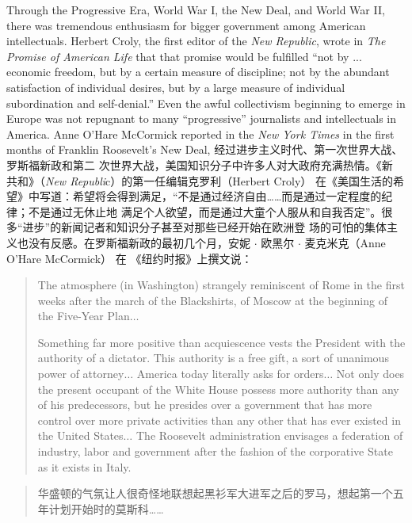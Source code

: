 \begin{paracol}{2}
Through the Progressive Era, World War I, the New Deal, and
World War II, there was tremendous enthusiasm for bigger
government among American intellectuals. Herbert Croly, the
first editor of the \textit{New Republic}, wrote in\textit{ The Promise of American Life} that that promise would be fulfilled ``not by ... economic
freedom, but by a certain measure of discipline; not by the
abundant satisfaction of individual desires, but by a large measure of individual subordination and self-denial.'' Even the
awful collectivism beginning to emerge in Europe was not repugnant to many ``progressive'' journalists and intellectuals in
America. Anne O'Hare McCormick reported in the \textit{New York
Times} in the first months of Franklin Roosevelt's New Deal,
\switchcolumn
经过进步主义时代、第一次世界大战、罗斯福新政和第二
次世界大战，美国知识分子中许多人对大政府充满热情。《新
共和》（\textit{New Republi}c）的第一任编辑克罗利（Herbert Croly）
在《美国生活的希望》中写道：希望将会得到满足，“不是通过经济自由……而是通过一定程度的纪律；不是通过无休止地
满足个人欲望，而是通过大童个人服从和自我否定”。很多“进步”的新闻记者和知识分子甚至对那些已经开始在欧洲登
场的可怕的集体主义也没有反感。在罗斯福新政的最初几个月，安妮 $\cdot$ 欧黑尔 $\cdot$ 麦克米克（Anne O’Hare McCormick） 在
《纽约时报》上撰文说：
\switchcolumn*
\begin{quotation}
The atmosphere (in Washington) strangely reminiscent of
Rome in the first weeks after the march of the Blackshirts, of
Moscow at the beginning of the Five-Year Plan$\ldots$


Something far more positive than acquiescence vests the President with the authority of a dictator. This authority is a free gift,
a sort of unanimous power of attorney$\ldots$ America today literally asks for orders$\ldots$ Not only does the present occupant of
the White House possess more authority than any of his predecessors, but he presides over a government that has more control
over more private activities than any other that has ever existed
in the United States$\ldots$ The Roosevelt administration envisages a federation of industry, labor and government after the
fashion of the corporative State as it exists in Italy.
\end{quotation}
\switchcolumn
\begin{quotation}
华盛顿的气氛让人很奇怪地联想起黑衫军大进军之后的罗马，想起第一个五年计划开始时的莫斯科……
	

\end{quotation}
\end{paracol}
